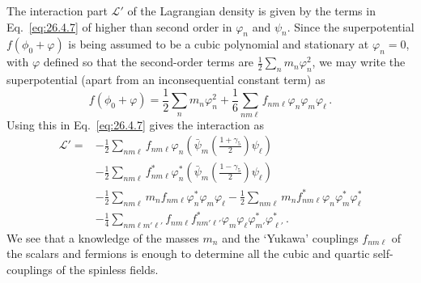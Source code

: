 The interaction part \(\mathcal{L}'\) of the Lagrangian density is given by the
terms in Eq.~\eqref{eq:26.4.7} of higher than second order in \(\varphi_n\) and
\(\psi_n\). Since the superpotential \(f(\phi_0+\varphi)\) is being assumed to
be a cubic polynomial and stationary at \(\varphi_n=0\), with \(\varphi\)
defined so that the second-order terms are
\(\frac12\sum_n m_n\varphi_n^2\), we may write the superpotential (apart from
an inconsequential constant term) as
\begin{equation}
  f(\phi_0+\varphi)
  =\frac12\sum_n m_n\varphi_n^2
  +\frac16\sum_{nm\ell}f_{nm\ell}\varphi_n\varphi_m\varphi_\ell\,.
  \tag{26.4.16}\label{eq:26.4.16}
\end{equation}
Using this in Eq.~\eqref{eq:26.4.7} gives the interaction as
\begin{equation}
  \begin{aligned}
  \mathcal{L}'={}&
  -\frac12\sum_{nm\ell}f_{nm\ell}\varphi_n
    \left(\bar\psi_m\left(\frac{1+\gamma_5}{2}\right)\psi_\ell\right)
  \\
  &-\frac12\sum_{nm\ell}f_{nm\ell}^*\varphi_n^*
    \left(\bar\psi_m\left(\frac{1-\gamma_5}{2}\right)\psi_\ell\right)
  \\
  &-\frac12\sum_{nm\ell}m_nf_{nm\ell}
    \varphi_n^*\varphi_m\varphi_\ell
  -\frac12\sum_{nm\ell}m_nf_{nm\ell}^*
    \varphi_n\varphi_m^*\varphi_\ell^*
  \\
  &-\frac14\sum_{nm\ell m'\ell'}
    f_{nm\ell}f_{nm'\ell'}^*
    \varphi_m\varphi_\ell\varphi_{m'}^*\varphi_{\ell'}^*\,.
  \end{aligned}
  \tag{26.4.17}\label{eq:26.4.17}
\end{equation}
We see that a knowledge of the masses \(m_n\) and the `Yukawa' couplings
\(f_{nm\ell}\) of the scalars and fermions is enough to determine all the cubic
and quartic self-couplings of the spinless fields.

